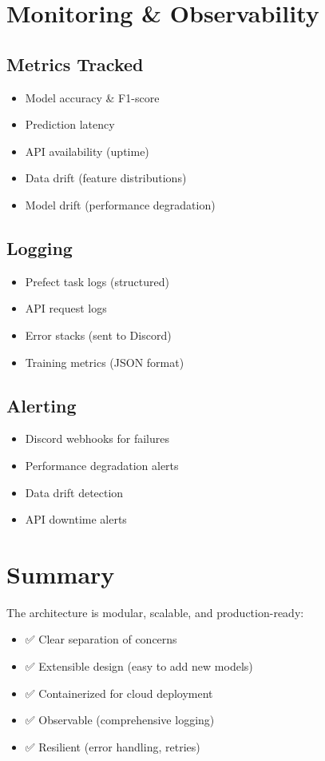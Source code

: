 \section{Monitoring \& Observability}

\subsection{Metrics Tracked}
\begin{itemize}
    \item Model accuracy \& F1-score
    \item Prediction latency
    \item API availability (uptime)
    \item Data drift (feature distributions)
    \item Model drift (performance degradation)
\end{itemize}

\subsection{Logging}
\begin{itemize}
    \item Prefect task logs (structured)
    \item API request logs
    \item Error stacks (sent to Discord)
    \item Training metrics (JSON format)
\end{itemize}

\subsection{Alerting}
\begin{itemize}
    \item Discord webhooks for failures
    \item Performance degradation alerts
    \item Data drift detection
    \item API downtime alerts
\end{itemize}

\section{Summary}

The architecture is modular, scalable, and production-ready:
\begin{itemize}
    \item ✅ Clear separation of concerns
    \item ✅ Extensible design (easy to add new models)
    \item ✅ Containerized for cloud deployment
    \item ✅ Observable (comprehensive logging)
    \item ✅ Resilient (error handling, retries)
\end{itemize}

